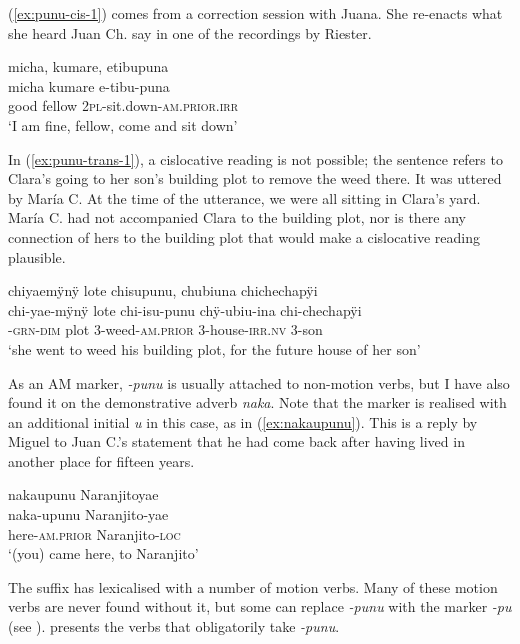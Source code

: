 (\ref{ex:punu-cis-1}) comes from a correction session with Juana. She re-enacts what she heard Juan Ch. say in one of the recordings by Riester.

\ea\label{ex:punu-cis-1}
\begingl 
\glpreamble micha, kumare, etibupuna\\
\gla micha kumare e-tibu-puna\\ 
\glb good fellow 2\textsc{pl}-sit.down-\textsc{am.prior.irr}\\ 
\glft ‘I am fine, fellow, come and sit down’\\ 
\endgl
\trailingcitation{[jxx-p120430l-2.039]}
\xe

In (\ref{ex:punu-trans-1}), a cislocative reading is not possible; the sentence refers to Clara’s going to her son's building plot to remove the weed there. It was uttered by María C. At the time of the utterance, we were all sitting in Clara’s yard. María C. had not accompanied Clara to the building plot, nor is there any connection of hers to the building plot that would make a cislocative reading plausible.

\ea\label{ex:punu-trans-1}
\begingl 
\glpreamble chiyaemÿnÿ lote chisupunu, chubiuna chichechapÿi\\
\gla chi-yae-mÿnÿ lote chi-isu-punu chÿ-ubiu-ina chi-chechapÿi\\ 
-\textsc{grn}-\textsc{dim} plot 3-weed-\textsc{am.prior} 3-house-\textsc{irr.nv} 3-son\\ 
\glft ‘she went to weed his building plot, for the future house of her son’\\ 
\endgl
\trailingcitation{[cux-c120414ls-1.98-101]}
\xe

As an AM marker, \textit{-punu} is usually attached to non-motion verbs, but I have also found it on the demonstrative adverb \textit{naka}. Note that the marker is realised with an additional initial \textit{u} in this case, as in (\ref{ex:nakaupunu}). This is a reply by Miguel to Juan C.’s statement that he had come back after having lived in another place for fifteen years.

\ea\label{ex:nakaupunu}
\begingl 
\glpreamble nakaupunu Naranjitoyae\\
\gla naka-upunu Naranjito-yae\\ 
\glb here-\textsc{am.prior} Naranjito-\textsc{loc}\\ 
\glft ‘(you) came here, to Naranjito’\\ 
\endgl
\trailingcitation{[mqx-p110826l.451]}
\xe

The suffix has lexicalised with a number of motion verbs. Many of these motion verbs are never found without it, but some can replace \textit{-punu} with the  marker \textit{-pu} (see ).  presents the verbs that obligatorily take \textit{-punu}.

